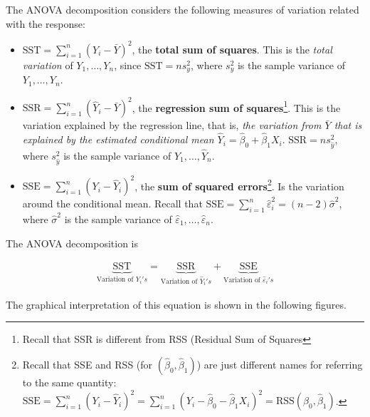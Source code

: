 \documentclass[]{book}
\providecommand{\tightlist}{%
  \setlength{\itemsep}{0pt}\setlength{\parskip}{0pt}}
\let\rmarkdownfootnote\footnote%
\def\footnote{\protect\rmarkdownfootnote}
\begin{document}
The ANOVA decomposition considers the following measures of variation
related with the response:

\begin{itemize}
\tightlist
\item
  \(\text{SST}=\sum_{i=1}^n\left(Y_i-\bar Y\right)^2\), the
  \textbf{total sum of squares}. This is the \emph{total variation} of
  \(Y_1,\ldots,Y_n\), since \(\text{SST}=ns_y^2\), where \(s_y^2\) is
  the sample variance of \(Y_1,\ldots,Y_n\).
\item
  \(\text{SSR}=\sum_{i=1}^n\left(\hat Y_i-\bar Y\right)^2\), the
  \textbf{regression sum of squares}\footnote{Recall that SSR is
    different from RSS (Residual Sum of Squares}. This is the variation
  explained by the regression line, that is, \emph{the variation from
  \(\bar Y\) that is explained by the estimated conditional mean
  \(\hat Y_i=\hat\beta_0+\hat\beta_1X_i\)}.
  \(\text{SSR}=ns_{\hat y}^2\), where \(s_{\hat y}^2\) is the sample
  variance of \(\hat Y_1,\ldots,\hat Y_n\).
\item
  \(\text{SSE}=\sum_{i=1}^n\left(Y_i-\hat Y_i\right)^2\), the
  \textbf{sum of squared errors}\footnote{Recall that SSE and RSS (for
    \((\hat \beta_0,\hat \beta_1)\)) are just different names for
    referring to the same quantity:
    \(\text{SSE}=\sum_{i=1}^n\left(Y_i-\hat Y_i\right)^2=\sum_{i=1}^n\left(Y_i-\hat \beta_0-\hat \beta_1X_i\right)^2=\mathrm{RSS}\left(\hat \beta_0,\hat \beta_1\right)\).}.
  Is the variation around the conditional mean. Recall that
  \(\text{SSE}=\sum_{i=1}^n \hat\varepsilon_i^2=(n-2)\hat\sigma^2\),
  where \(\hat\sigma^2\) is the sample variance of
  \(\hat \varepsilon_1,\ldots,\hat \varepsilon_n\).
\end{itemize}

The ANOVA decomposition is

\begin{align*}
\underbrace{\text{SST}}_{\text{Variation of }Y_i's} = \underbrace{\text{SSR}}_{\text{Variation of }\hat Y_i's} + \underbrace{\text{SSE}}_{\text{Variation of }\hat \varepsilon_i's}
\end{align*}

The graphical interpretation of this equation is shown in the following
figures.
\end{document}
